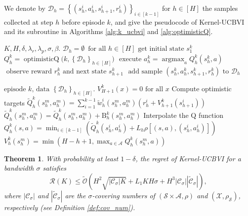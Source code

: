 \documentclass{article}
\numberwithin{equation}{section}
\newtheorem{theorem}{Theorem}
\newcommand{\cA}{\mathcal{A}}
\newcommand{\cS}{\mathcal{S}}
\begin{document}
We denote by $\mathcal{D}_h=\left\{\left(s_h^i, a_h^i, s_{h+1}^i, r_h^i\right)\right\}_{i \in[k-1]}$ for $h \in[H]$ the samples collected at step $h$ before episode $k$, and
give the pseudocode of Kernel-UCBVI and its subroutine in Algorithms \ref{alg:k_ucbvi} and \ref{alg:optimisticQ}.
\begin{algorithm}[ht]
	\caption{Kernel-UCBVI}
	\begin{algorithmic}[1]\label{alg:k_ucbvi}
        \REQUIRE \(K, H, \delta, \lambda_r, \lambda_p, \sigma, \beta\).
        \STATE \(\mathcal{D}_h=\emptyset\, \text { for all } h \in[H]\)
            \STATE $\text {get initial state } s_1^k$
            \STATE $Q_h^k=\operatorname{optimisticQ }\bigl(k,\left\{\mathcal{D}_h\right\}_{h \in[H]}\bigr)$
                \STATE $\text { execute } a_h^k=\operatorname{argmax}_a Q_h^k\left(s_h^k, a\right)$
                \STATE $\text { observe reward } r_h^k \text { and next state } s_{h+1}^k$
                \STATE $\text { add sample } (s_h^k, a_h^k, s_{h+1}^k, r_h^k) \text { to } \mathcal{D}_h$
            \ENDFOR
        \ENDFOR
	\end{algorithmic}	
\end{algorithm}
\begin{algorithm}[ht]
	\caption{optimisticQ}
	\begin{algorithmic}[1]\label{alg:optimisticQ}
        \REQUIRE \(\text {episode } k \text {, data }\left\{\mathcal{D}_h\right\}_{h \in[H]}\).
        \STATE \(V_{H+1}^k(x)=0 \text { for all } x\)
            \STATE Compute optimistic targets
                \STATE $\widetilde{Q}_h^k\left(s_h^m, a_h^m\right)=\sum_{i=1}^{k-1} \widetilde{w}_h^i\left(s_h^m, a_h^m\right)\left(r_h^i+V_{h+1}^k\left(s_{h+1}^i\right)\right)$
                \STATE $\widetilde{Q}_h^k\left(s_h^m, a_h^m\right)=\widetilde{Q}_h^k\left(s_h^m, a_h^m\right)+\mathrm{B}_h^k\left(s_h^m, a_h^m\right)$
            \ENDFOR
            \STATE Interpolate the Q function
            \STATE \(Q_h^k(s, a)=\min _{i \in[k-1]}\left(\widetilde{Q}_h^k\left(s_h^i, a_h^i\right)+L_h \rho\left[(s, a),\left(s_h^i, a_h^i\right)\right]\right)\)
                \STATE $V_h^k\left(s_h^m\right)=\min \left(H-h+1, \max_{a \in \mathcal{A}} Q_h^k\left(s_h^m, a\right)\right)$
            \ENDFOR
        \ENDFOR
	\end{algorithmic}	
\end{algorithm}
\begin{theorem}
    With probability at least $1-\delta$, the regret of Kernel-UCBVI for a bandwidth $\sigma$ satisfies
    $$
    \mathcal{R}(K) \leq \widetilde{\mathcal{O}}\left(H^2 \sqrt{\left|\mathcal{C}_\sigma\right| K}+L_1 K H \sigma+H^3\left|\mathcal{C}_\sigma\right||\widetilde{\mathcal{C}}_\sigma|\right),
    $$
    where $\left|\mathcal{C}_\sigma\right|$ and $|\widetilde{\mathcal{C}}_\sigma|$ are the $\sigma$-covering numbers of $(\cS \times \cA, \rho)$ and $(\mathcal{X}, \rho_{\cS})$, respectively (see Definition \ref{def:cov_num}).
\end{theorem}
\end{document}
